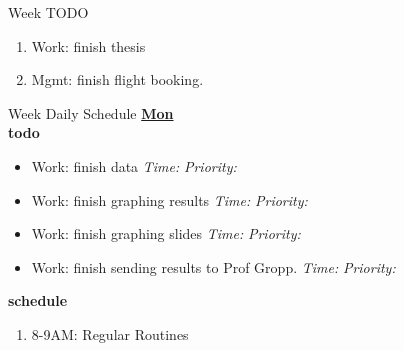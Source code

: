 \documentclass[serif, mathserif, final]{beamer}
\newcommand{\timeEst}[1]{\textit{Time:} \textit{#1}}
\newcommand{\priority}[1]{\textit{Priority:} \textit{#1}}
\newcommand{\deadline}[1]{#1}
\begin{document}
\begin{frame}{}
\begin{columns}
\begin{column}{0.50\linewidth}
  \begin{block}{Week TODO} 
    \begin{enumerate} 
    \item Work: finish thesis 
    \item Mgmt: finish flight booking. 
    \end{enumerate}
  \end{block} 
  
  \begin{block}{Week Daily Schedule} 
    \textbf{\small \underline{Mon}} \\
  \textbf{\small todo} \\
  \begin{itemize} 
    \tiny \item \tiny Work: finish data  \deadline{ }   \timeEst{}  \priority{} 
    \tiny \item \tiny Work: finish graphing results  \deadline{ }   \timeEst{}  \priority{} 
    \tiny \item \tiny Work: finish graphing slides  \deadline{ }   \timeEst{}  \priority{} 
    \tiny \item \tiny Work: finish sending results to Prof Gropp.  \deadline{ }   \timeEst{}  \priority{} 

  \end{itemize}  
  \textbf{\small schedule} \\
  \begin{enumerate} 
    \tiny \item \tiny 8-9AM: Regular Routines 
  \end{enumerate} 




\end{block}
\end{column}
\end{columns}
\end{frame}
\end{document}
